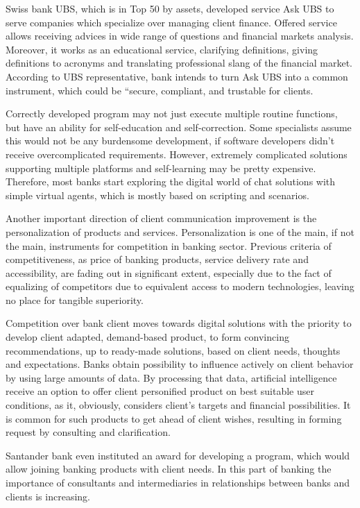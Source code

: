 Swiss bank UBS, which is in Top 50 by assets, developed service Ask UBS to serve companies which specialize over managing client finance.
Offered service allows receiving advices in wide range of questions and financial markets analysis.
Moreover, it works as an educational service, clarifying definitions, giving definitions to acronyms and translating professional slang of the financial market.
According to UBS representative, bank intends to turn Ask UBS into a common instrument, which could be “secure, compliant, and trustable for clients.
\cite{ways_ai_transforming_bi}

Correctly developed program may not just execute multiple routine functions, but have an ability for self-education and self-correction.
Some specialists assume this would not be any burdensome development, if software developers didn't receive overcomplicated requirements.
However, extremely complicated solutions supporting multiple platforms and self-learning may be pretty expensive.
Therefore, most banks start exploring the digital world of chat solutions with simple virtual agents, which is mostly based on scripting and scenarios.

Another important direction of client communication improvement is the personalization of products and services.
Personalization is one of the main, if not the main, instruments for competition in banking sector.
Previous criteria of competitiveness, as price of banking products,  service delivery rate and accessibility, are fading out in significant extent, especially due to the fact of equalizing of competitors due to equivalent access to modern technologies, leaving no place for tangible superiority.

Competition over bank client moves towards digital solutions with the priority to develop client adapted, demand-based product, to form convincing recommendations, up to ready-made solutions, based on client needs, thoughts and expectations.
Banks obtain possibility to influence actively on client behavior by using large amounts of data.
By processing that data, artificial intelligence receive an option to offer client personified product on best suitable user conditions, as it, obviously, considers client's targets and financial possibilities.
It is common for such products to get ahead of client wishes, resulting in forming request by consulting and clarification.
\cite{ai_transform_disrupt}

Santander bank even instituted an award for developing a program, which would allow joining banking products with client needs.
\cite{ways_ai_transforming_bi}
In this part of banking the importance of consultants and intermediaries in relationships between banks and clients is increasing.

